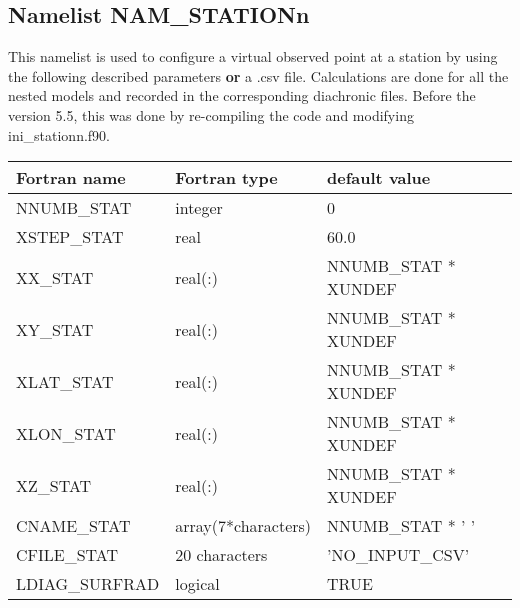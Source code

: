 \subsection{Namelist NAM\_STATIONn }\label{s:namstationn}
%
This namelist is used to configure a virtual observed point at a station by using the following described parameters \textbf{or} a .csv file. Calculations are done for all the nested models and recorded in the corresponding diachronic files. Before the version 5.5, this was done by re-compiling the code and modifying ini\_stationn.f90.

\vspace{0.5cm}
\begin{longtable} {|p{}|p{}|p{}|}
\hline
Fortran name &  Fortran type & default value \\
\hline 
\endhead
\hline
\endfoot
NNUMB\_STAT    & integer &  0 \\
XSTEP\_STAT    & real  &  60.0 \\
XX\_STAT       & real(:)  &  NNUMB\_STAT * XUNDEF \\
XY\_STAT       & real(:)  &  NNUMB\_STAT * XUNDEF  \\
XLAT\_STAT     & real(:)  &  NNUMB\_STAT * XUNDEF \\
XLON\_STAT     & real(:)  &  NNUMB\_STAT * XUNDEF \\
XZ\_STAT       & real(:)  &  NNUMB\_STAT * XUNDEF \\
CNAME\_STAT    & array(7*characters)  &  NNUMB\_STAT * ' ' \\
CFILE\_STAT    & 20 characters  &  'NO\_INPUT\_CSV' \\
LDIAG\_SURFRAD & logical & TRUE \\
\end{longtable}
